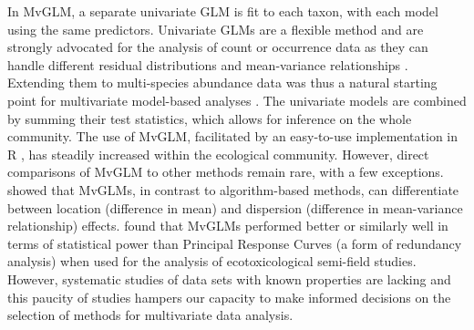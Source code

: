 	
	In MvGLM, a separate univariate GLM is fit to each taxon, with each model using the same predictors. 
	Univariate GLMs are a flexible method and are strongly advocated for the analysis of count or occurrence data as they can handle different residual distributions and mean-variance relationships \citep{OHara2010, Warton2011, Szocs2015_b}.
	Extending them to multi-species abundance data was thus a natural starting point for multivariate model-based analyses \citep{Warton2012}.
	The univariate models are combined by summing their test statistics, which allows for inference on the whole community.
	The use of MvGLM, facilitated by an easy-to-use implementation in R  \citep[in the \textit{mvabund} R-package, ][]{Wang2019}, has steadily increased within the ecological community. 
	However, direct comparisons of MvGLM to other methods remain rare, with a few exceptions.
 	\citet{Warton2012} showed that MvGLMs, in contrast to algorithm-based methods, can differentiate between location (difference in mean) and dispersion (difference in mean-variance relationship) effects. 
	\citet{Szocs2015} found that MvGLMs performed better or similarly well in terms of statistical power than Principal Response Curves (a form of redundancy analysis) when used for the analysis of ecotoxicological semi-field studies. 
	However, systematic studies of data sets with known properties are lacking and this paucity of studies hampers our capacity to make informed decisions on the selection of methods for multivariate data analysis.\\
